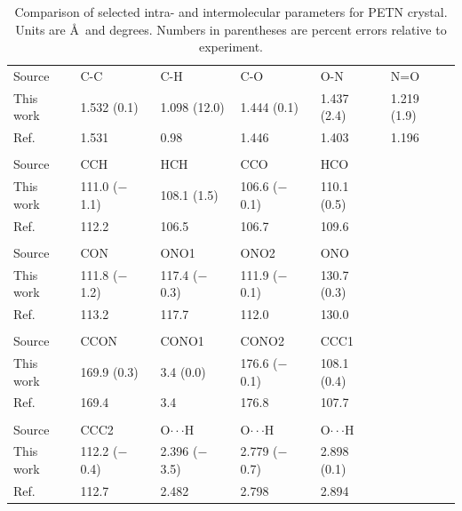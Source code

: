 \documentclass[prb,aps,nobibnotes,superbib,preprint]{revtex4}
\begin{document}
\begin{table}[p]
\begin{center}
\begin{tabular}{llllll}
\hline\hline
Source & C-C & C-H & C-O & O-N & N=O  \\
This work & 1.532 (0.1) & 1.098 (12.0) & 1.444 (0.1) &  1.437 (2.4) & 1.219 (1.9) \\
Ref.~\cite{Conant_1979} &  1.531   &   0.98  & 1.446  &  1.403 &   1.196 \\
\hline
\\
Source  &  CCH   &        HCH     &      CCO    &       HCO \\
This work & 111.0 ($-$1.1)  & 108.1  (1.5) &  106.6 ($-$0.1) & 110.1 (0.5) \\
Ref.~\cite{Conant_1979} &  112.2    &  106.5  &  106.7   & 109.6 \\
\hline
\\
Source   &  CON     &       ONO1   &        ONO2     &      ONO \\
This work&  111.8 ($-$1.2) &  117.4 ($-$0.3)&  111.9 ($-$0.1)&  130.7 (0.3)\\
Ref.~\cite{Conant_1979} &    113.2   &       117.7   &       112.0   &       130.0\\
\hline\\
Source &    CCON    &       CONO1   &       CONO2    &   CCC1\\
This work &  169.9 (0.3) &   3.4 (0.0) &     176.6 ($-$0.1) & 108.1 (0.4)\\
Ref.~\cite{Conant_1979} &   169.4   &       3.4     &       176.8        & 107.7\\
\hline\\
Source &  CCC2 &  O$\cdot\cdot\cdot$H   &       O$\cdot\cdot\cdot$H   &       O$\cdot\cdot\cdot$H\\
This work &  112.2 ($-$0.4) & 2.396 ($-$3.5) &   2.779 ($-$0.7) & 2.898 (0.1)\\
Ref.~\cite{Conant_1979} &   112.7 & 2.482   &       2.798   &       2.894\\
\hline\hline
\end{tabular}
\end{center}
\caption{Comparison of selected intra- and intermolecular parameters for
PETN crystal.  Units are \AA\ and degrees.  Numbers in parentheses
are percent errors relative to experiment.
}
\label{tab:table2}
\end{table}
\end{document}

